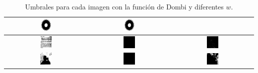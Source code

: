 \begin{table}
\begin{tabular}{c|c|c}
\includegraphics[width=0.15\textwidth]{img/res/e6/alg1agregadoowa202.jpg} &
\includegraphics[width=0.15\textwidth]{img/res/e6/alg1agregadoowa302.jpg} \\\hline
\includegraphics[width=0.15\textwidth]{img/res/e6/alg1agregadoowa109.jpg} &
\includegraphics[width=0.15\textwidth]{img/res/e6/alg1agregadoowa209.jpg} &
\includegraphics[width=0.15\textwidth]{img/res/e6/alg1agregadoowa309.jpg} \\\hline
\includegraphics[width=0.15\textwidth]{img/res/e6/alg1agregadoowa107.jpg} &
\includegraphics[width=0.15\textwidth]{img/res/e6/alg1agregadoowa207.jpg} &
\includegraphics[width=0.15\textwidth]{img/res/e6/alg1agregadoowa307.jpg} \\\hline
\end{tabular}
\caption{Umbrales para cada imagen con la función de Dombi y diferentes $w$.\label{tab:resultexp6imagenesdombi}}
\end{table}

